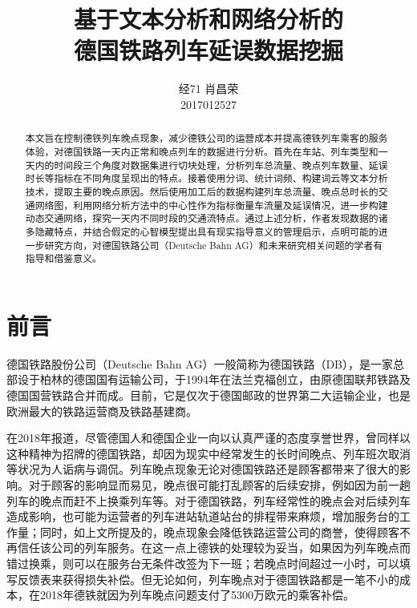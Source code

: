 \documentclass[lang=cn,12pt,a4paper,cite=authoryear]{elegantpaper}
\title{基于文本分析和网络分析的\\德国铁路列车延误数据挖掘}
\author{经71 肖昌荣 \\ 2017012527}
\institute{清华大学经济管理学院}
\date{\zhtoday}
\begin{document}
\maketitle

\begin{abstract}
本文旨在控制德铁列车晚点现象，减少德铁公司的运营成本并提高德铁列车乘客的服务体验，对德国铁路一天内正常和晚点列车的数据进行分析。首先在车站、列车类型和一天内的时间段三个角度对数据集进行切块处理，分析列车总流量、晚点列车数量、延误时长等指标在不同角度呈现出的特点。接着使用分词、统计词频、构建词云等文本分析技术，提取主要的晚点原因。然后使用加工后的数据构建列车总流量、晚点总时长的交通网络图，利用网络分析方法中的中心性作为指标衡量车流量及延误情况，进一步构建动态交通网络，探究一天内不同时段的交通流特点。通过上述分析，作者发现数据的诸多隐藏特点，并结合假定的心智模型提出具有现实指导意义的管理启示，点明可能的进一步研究方向，对德国铁路公司（Deutsche Bahn AG）和未来研究相关问题的学者有指导和借鉴意义。
\end{abstract}

\newpage

\tableofcontents

\newpage

\section{前言}

德国铁路股份公司（Deutsche Bahn AG）一般简称为德国铁路（DB），是一家总部设于柏林的德国国有运输公司，于1994年在法兰克福创立，由原德国联邦铁路及德国国营铁路合并而成。目前，它是仅次于德国邮政的世界第二大运输企业，也是欧洲最大的铁路运营商及铁路基建商\citep{DB_wiki}。

\cite{DB_joke}在2018年报道，尽管德国人和德国企业一向以认真严谨的态度享誉世界，曾同样以这种精神为招牌的德国铁路，却因为现实中经常发生的长时间晚点、列车班次取消等状况为人诟病与调侃。列车晚点现象无论对德国铁路还是顾客都带来了很大的影响。对于顾客的影响显而易见，晚点很可能打乱顾客的后续安排，例如因为前一趟列车的晚点而赶不上换乘列车等。对于德国铁路，列车经常性的晚点会对后续列车造成影响，也可能为运营者的列车进站轨道站台的排程带来麻烦，增加服务台的工作量；同时，如上文所提及的，晚点现象会降低铁路运营公司的商誉，使得顾客不再信任该公司的列车服务。在这一点上德铁的处理较为妥当，如果因为列车晚点而错过换乘，则可以在服务台无条件改签为下一班；若晚点时间超过一小时，可以填写反馈表来获得损失补偿。但无论如何，列车晚点对于德国铁路都是一笔不小的成本，在2018年德铁就因为列车晚点问题支付了5300万欧元的乘客补偿\citep{DB_cost}。
\end{document}
